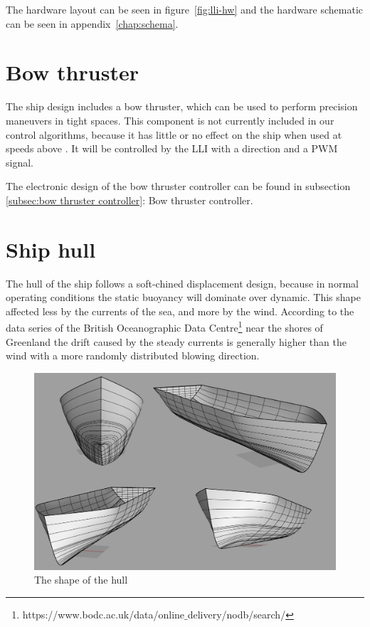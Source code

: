 The hardware layout can be seen in figure~\vref{fig:lli-hw} and the hardware schematic can be seen in appendix~\vref{chap:schema}.



\section{Bow thruster}
The ship design includes a bow thruster, which can be used to perform precision maneuvers in tight spaces. This component is not currently included in our control algorithms, because it has little or no effect on the ship when used at speeds above . It will be controlled by the \ac{LLI} with a direction and a \ac{PWM} signal. 

The electronic design of the bow thruster controller can be found in subsection \ref{subsec:bow thruster controller}: Bow thruster controller.

\section{Ship hull}

The hull of the ship follows a soft-chined displacement design, because in normal operating conditions the static buoyancy will dominate over dynamic. This shape affected less by the currents of the sea, and more by the wind. According to the data series of the British Oceanographic Data Centre\footnote[1]{https://www.bodc.ac.uk/data/online$\_$delivery/nodb/search/} near the shores of Greenland the drift caused by the steady currents is generally higher than the wind with a more randomly distributed blowing direction.

\begin{figure}[hullshape]
	\centering
	\includegraphics[width=\textwidth]{img/render/rendermontage.png}
	\caption{The shape of the hull}
	\label{fig:vessel-block-overview}
\end{figure}

